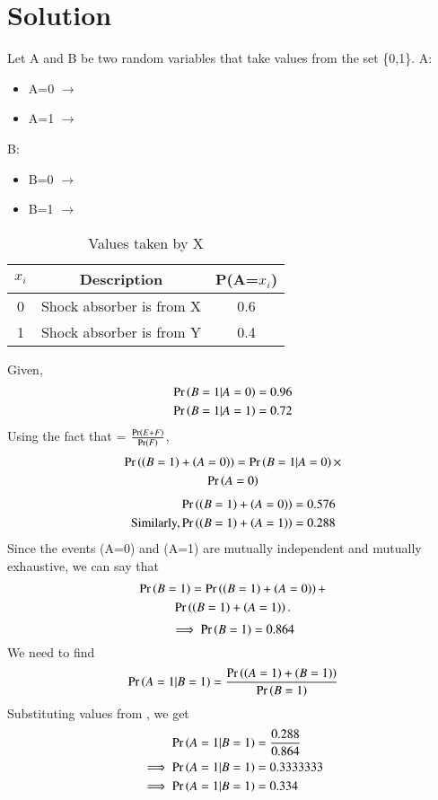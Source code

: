\documentclass[journal,12pt,twocolumn]{IEEEtran}
\begin{document}
\section{\textbf{Solution}}
Let A and B be two random variables that take values from the set \{0,1\}.\newline
A:
\begin{itemize}
    \item A=0 $\rightarrow$ 
    \item A=1 $\rightarrow$ 
\end{itemize}
B:
\begin{itemize}
    \item B=0 $\rightarrow$ 
    \item B=1 $\rightarrow$ 
\end{itemize}
\begin{table}[h!]
    \centering
    \begin{tabular}{|c|c|c|}
        \hline
        $x_i$ & Description & P(A=$x_i$)\\
        \hline
        0 & Shock absorber is from X & 0.6\\
        1 & Shock absorber is from Y & 0.4\\
        \hline
    \end{tabular}
    \caption{Values taken by X}
    \label{tab:1}
\end{table}
Given,
\begin{align}
    \Pr\left(B=1|A=0\right) &= 0.96\\
    \Pr\left(B=1|A=1\right) &= 0.72
\end{align}
Using the fact that  = $\frac{\Pr\left(E+F\right)}{\Pr\left(F\right)}$,
\begin{multline}
    \Pr\left(\left(B=1\right)+\left(A=0\right)\right) = \Pr\left(B=1|A=0\right) \times \\
    \Pr\left(A=0\right)
\end{multline}
\begin{align}
\Pr\left(\left(B=1\right)+\left(A=0\right)\right) &= 0.576 \\
\text{Similarly,}\label{2.0.5} \Pr\left(\left(B=1\right)+\left(A=1\right)\right) &= 0.288 
\end{align}
Since the events (A=0) and (A=1) are mutually independent and mutually exhaustive, we can say that 
\begin{multline}
    \Pr\left(B=1\right) = \Pr\left(\left(B=1\right)+\left(A=0\right)\right) + \\
    \Pr\left(\left(B=1\right)+\left(A=1\right)\right).
\end{multline}
\begin{equation}\label{(2.0.7)}
    \implies \Pr\left(B=1\right) = 0.864
\end{equation}
We need to find 
\begin{align}
    \Pr\left(A=1|B=1\right) = \frac{\Pr\left(\left(A=1\right)+\left(B=1\right)\right)}{\Pr\left(B=1\right)}
\end{align}
Substituting values from  , we get
\begin{align}
    \Pr\left(A=1|B=1\right) &= \frac{0.288}{0.864} \\
    \implies \Pr\left(A=1|B=1\right) &= 0.3333333 \\
    \implies \Pr\left(A=1|B=1\right) &= 0.334
\end{align}
\end{document}
